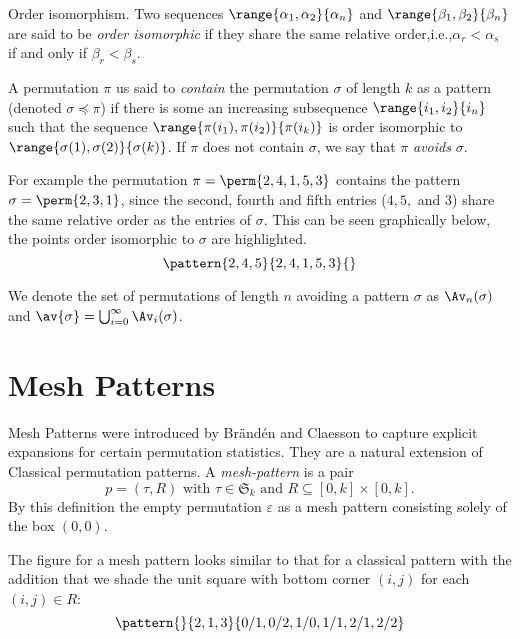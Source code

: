 \begin{definition}{Order isomorphism.}
    Two sequences \(\range{\alpha_1,\alpha_2}{\alpha_n}\) and
    \(\range{\beta_1,\beta_2}{\beta_n}\) are said to be \emph{order isomorphic}
    if they share the same relative order,i.e.,\(\alpha_r<\alpha_s\) if and
    only if \(\beta_r<\beta_s\).
\end{definition}

A permutation \(\pi\) us said to \emph{contain} the permutation \(\sigma\) of
length \(k\) as a pattern (denoted \(\sigma \preceq \pi\)) if there is some
an increasing subsequence \(\range{i_1,i_2}{i_n}\) such that the sequence
\(\range{\pi(i_1),\pi(i_2)}{\pi(i_k)}\) is order isomorphic to
\(\range{\sigma(1),\sigma(2)}{\sigma(k)}\). If \(\pi\) does not contain
\(\sigma\), we say that \(\pi\) \emph{avoids} \(\sigma\).

For example the permutation \(\pi = \perm{2,4,1,5,3}\) contains the pattern
\(\sigma = \perm{2,3,1}\), since the second, fourth and fifth entries
(\(4,5,\) and \(3\)) share the same relative order as the entries of \(\sigma\).
This can be seen graphically below, the points order isomorphic to \(\sigma\)
are highlighted.
\begin{equation*}
    \pattern{2,4,5}{2,4,1,5,3}{}
\end{equation*}

We denote the set of permutations of length \(n\) avoiding a pattern \(\sigma\)
as \(\Av_n(\sigma)\) and \(\av{\sigma} = \bigcup_{i=0}^{\infty}\Av_i(\sigma)\).

\section{Mesh Patterns}
Mesh Patterns were introduced by Brändén and Claesson to capture explicit expansions
for certain permutation statistics. They are a natural extension of Classical
permutation patterns. A \emph{mesh-pattern} is a pair
\begin{equation*}
    p = (\tau,R)\text{ with } \tau \in \mathfrak{S}_k \text{ and } R \subseteq
    [0,k]\times [0,k].
\end{equation*}
By this definition the empty permutation \(\varepsilon\) as a mesh pattern consisting solely of the
box \((0,0)\).

The figure for a mesh pattern looks similar to that for a classical pattern with the
addition that we shade the unit square with bottom corner \((i,j)\) for each \((i,j) \in R\):
\begin{equation*}
    \pattern{}{ 2, 1, 3 }{ 0/1, 0/2, 1/0, 1/1, 2/1, 2/2 }
\end{equation*}

